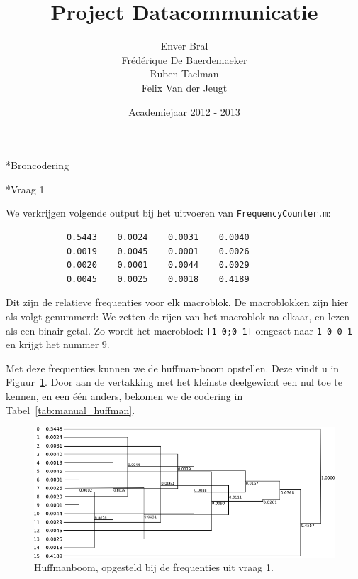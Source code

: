\documentclass[]{article}
\title{Project Datacommunicatie}
\author{Enver Bral \\
        Fr\'ed\'erique De Baerdemaeker \\
        Ruben Taelman \\
        Felix Van der Jeugt}
\date{Academiejaar 2012 - 2013}
\begin{document}
\maketitle

\begin{section}*{Broncodering}

    \begin{subsection}*{Vraag 1}

        We verkrijgen volgende output bij het uitvoeren van
        \texttt{FrequencyCounter.m}:

        \begin{lstlisting}
            0.5443    0.0024    0.0031    0.0040
            0.0019    0.0045    0.0001    0.0026
            0.0020    0.0001    0.0044    0.0029
            0.0045    0.0025    0.0018    0.4189
        \end{lstlisting}

        Dit zijn de relatieve frequenties voor elk macroblok. De
        macroblokken zijn hier als volgt genummerd: We zetten de rijen
        van het macroblok na elkaar, en lezen als een binair getal.  Zo
        wordt het macroblock \texttt{[1 0;0 1]} omgezet naar
        \texttt{1 0 0 1} en krijgt het nummer $9$.

        Met deze frequenties kunnen we de huffman-boom opstellen. Deze
        vindt u in Figuur~\ref{fig:manual_huffman}. Door aan de
        vertakking met het kleinste deelgewicht een nul toe te kennen,
        en een \'e\'en anders, bekomen we de codering in
        Tabel~\ref{tab:manual_huffman}.

        \begin{figure}
            \centering
            \includegraphics[width=\textwidth]{manual_huffman.png}
            \caption{Huffmanboom, opgesteld bij de frequenties uit
            \label{fig:manual_huffman}
            vraag 1.}
        \end{figure}


\end{subsection}
\end{section}
\end{document}

